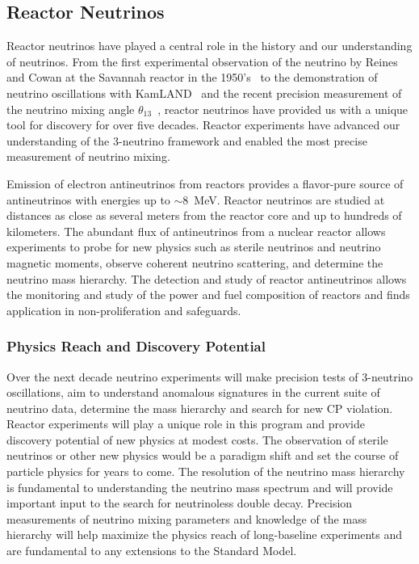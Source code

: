 \pagebreak
\subsection{Reactor Neutrinos}
\label{sec:Reactor}

Reactor neutrinos have played a central role in the history and our
understanding of neutrinos.  From the first experimental observation
of the neutrino by Reines and Cowan at the Savannah reactor in the
1950's~\cite{Reines:1960pr} to the demonstration of neutrino
oscillations with KamLAND~\cite{Abe:2008aa} and the recent precision
measurement of the neutrino mixing angle
$\theta_{13}$~\cite{Abe:2012tg, An:2013zwz}, reactor neutrinos have
provided us with a unique tool for discovery for over five
decades. Reactor experiments have advanced our understanding of the
3-neutrino framework and enabled the most precise measurement of
neutrino mixing.

Emission of electron antineutrinos from reactors provides a
flavor-pure source of antineutrinos with energies up to
$\sim$8~MeV. Reactor neutrinos are studied at distances as close as
several meters from the reactor core and up to hundreds of kilometers.
The abundant flux of antineutrinos from a nuclear reactor allows
experiments to probe for new physics such as sterile neutrinos and
neutrino magnetic moments, observe coherent neutrino scattering, and
determine the neutrino mass hierarchy. The detection and study of
reactor antineutrinos allows the monitoring and study of the power and
fuel composition of reactors and finds application in
non-proliferation and safeguards.

\subsubsection{Physics Reach and Discovery Potential}
Over the next decade neutrino experiments will make precision tests of
3-neutrino oscillations, aim to understand anomalous signatures in the
current suite of neutrino data, determine the mass hierarchy and
search for new CP violation. Reactor experiments will play a unique
role in this program and provide discovery potential of new physics at
modest costs. The observation of sterile neutrinos or other new
physics would be a paradigm shift and set the course of particle
physics for years to come.  The resolution of the neutrino mass
hierarchy is fundamental to understanding the neutrino mass spectrum
and will provide important input to the search for neutrinoless double
decay. Precision measurements of neutrino mixing parameters and
knowledge of the mass hierarchy will help maximize the physics reach
of long-baseline experiments and are fundamental to any extensions to
the Standard Model.

